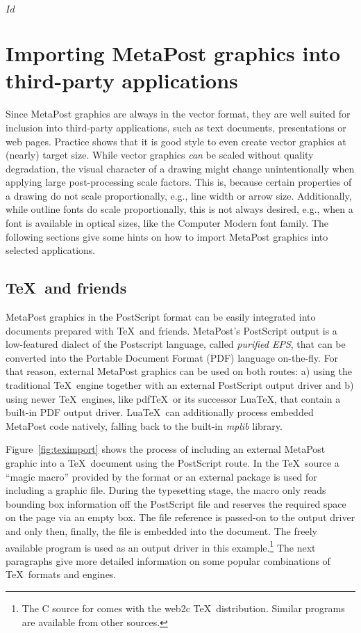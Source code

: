 \svnInfo $Id$
\section{Importing MetaPost graphics into third-party applications}
\label{mpimport}

Since MetaPost graphics are always in the vector format, they are well
suited for inclusion into third-party applications, such as text
documents, presentations or web pages.  Practice shows that it is good
style to even create vector graphics at (nearly) target size.  While
vector graphics \emph{can} be scaled without quality degradation, the
visual character of a drawing might change unintentionally when applying
large post-processing scale factors.  This is, because certain
properties of a drawing do not scale proportionally, e.g., line width or
arrow size.  Additionally, while outline fonts do scale proportionally,
this is not always desired, e.g., when a font is available in optical
sizes, like the Computer Modern font family.  The following sections
give some hints on how to import MetaPost graphics into selected
applications.

\subsection{\TeX\ and friends}
\label{teximport}

MetaPost graphics in the PostScript format can be
easily integrated into documents prepared with \TeX\ and friends.
MetaPost's PostScript output is a low-featured dialect of the Postscript
language, called \emph{purified EPS}, that can be
converted into the Portable Document Format (PDF) language
on-the-fly.  For that reason, external MetaPost graphics can be used on
both routes: a) using the traditional \TeX\ engine together with an
external PostScript output driver and b) using newer \TeX\ engines, like
pdf\TeX\ or its successor Lua\TeX, that contain a built-in PDF output
driver.  Lua\TeX\ can additionally process embedded MetaPost code
natively, falling back to the built-in \emph{mplib} library.

Figure~\ref{fig:teximport} shows the process of including an external
MetaPost graphic into a \TeX\ document using the PostScript route.  In
the \TeX\ source a ``magic macro'' provided by the format or an external
package is used for including a graphic file.  During the typesetting
stage, the macro only reads bounding box information off the PostScript
file and reserves the required space on the page via an empty box.  The
file reference is passed-on to the output driver and only then, finally,
the file is embedded into the document.  The freely available program
 is used as an output driver in this
example.\footnote{The C source for  comes with the web2c
  \TeX\ distribution.  Similar programs are available from other
  sources.}  The next paragraphs give more detailed information on some
popular combinations of \TeX\ formats and engines.

